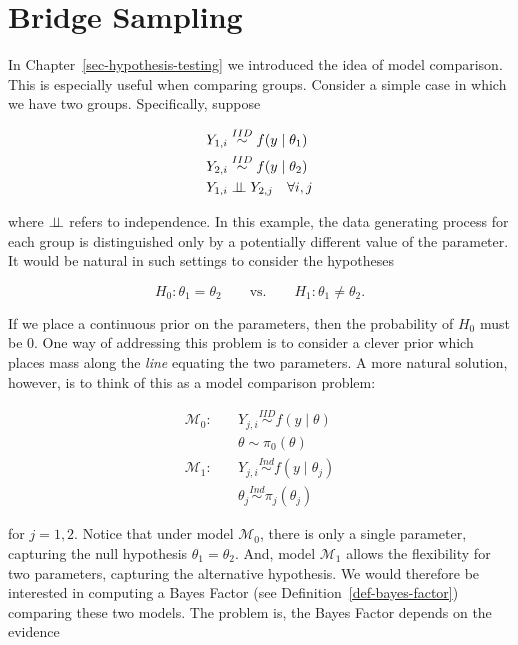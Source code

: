\documentclass[
  letterpaper,
  DIV=11,
  numbers=noendperiod]{scrreprt}
\theoremstyle{definition}
\theoremstyle{plain}
\theoremstyle{definition}
\theoremstyle{remark}
\begin{document}
\hypertarget{bridge-sampling}{%
\section{Bridge Sampling}\label{bridge-sampling}}

In Chapter~\ref{sec-hypothesis-testing} we introduced the idea of model
comparison. This is especially useful when comparing groups. Consider a
simple case in which we have two groups. Specifically, suppose

\[
\begin{aligned}
  Y_{1,i} &\stackrel{IID}{\sim} f(y \mid \theta_1) \\
  Y_{2,i} &\stackrel{IID}{\sim} f(y \mid \theta_2) \\
  Y_{1,i} &\perp\negthickspace\negmedspace\perp Y_{2,j} \quad \forall i, j
\end{aligned}
\]

where \(\perp\negthickspace\negmedspace\perp\) refers to independence.
In this example, the data generating process for each group is
distinguished only by a potentially different value of the parameter. It
would be natural in such settings to consider the hypotheses

\[H_0: \theta_1 = \theta_2 \qquad \text{vs.} \qquad H_1: \theta_1 \neq \theta_2.\]

If we place a continuous prior on the parameters, then the probability
of \(H_0\) must be 0. One way of addressing this problem is to consider
a clever prior which places mass along the \emph{line} equating the two
parameters. A more natural solution, however, is to think of this as a
model comparison problem:

\[
\begin{aligned}
  \mathcal{M}_0:& \quad Y_{j, i} \stackrel{IID}{\sim} f(y \mid \theta) \\
    & \quad \theta \sim \pi_0(\theta) \\
  \mathcal{M}_1:& \quad Y_{j, i} \stackrel{Ind}{\sim} f(y \mid \theta_j) \\
    & \quad \theta_j \stackrel{Ind}{\sim} \pi_j(\theta_j)
\end{aligned}
\]

for \(j = 1, 2\). Notice that under model \(\mathcal{M}_0\), there is
only a single parameter, capturing the null hypothesis
\(\theta_1 = \theta_2\). And, model \(\mathcal{M}_1\) allows the
flexibility for two parameters, capturing the alternative hypothesis. We
would therefore be interested in computing a Bayes Factor (see
Definition~\ref{def-bayes-factor}) comparing these two models. The
problem is, the Bayes Factor depends on the evidence
\end{document}
